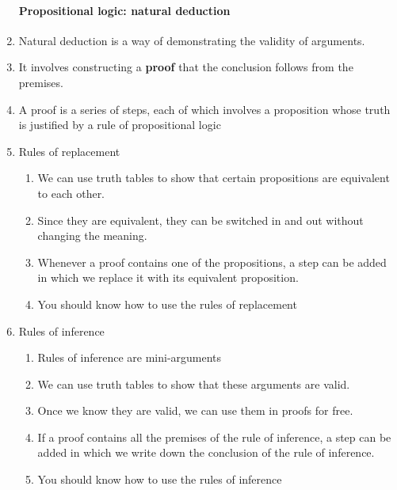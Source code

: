 \documentclass[10pt,landscape]{article}
\begin{document}
\begin{multicols}{2}
\begin{enumerate}
\paragraph{Propositional logic: natural deduction}
   \item Natural deduction is a way of demonstrating the validity of arguments.
   \item It involves constructing a \textbf{proof} that the conclusion follows from the premises.
   \item A proof is a series of steps, each of which involves a proposition whose truth is justified by a rule of propositional logic
   \item Rules of replacement
    \begin{enumerate}
     \item We can use truth tables to show that certain propositions are equivalent to each other.
     \item Since they are equivalent, they can be switched in and out without changing the meaning.
     \item Whenever a proof contains one of the propositions, a step can be added in which we replace it with its equivalent proposition.
     \item You should know how to use the rules of replacement
    \end{enumerate}
   \item Rules of inference
    \begin{enumerate}
     \item Rules of inference are mini-arguments
     \item We can use truth tables to show that these arguments are valid.
     \item Once we know they are valid, we can use them in proofs for free.
     \item If a proof contains all the premises of the rule of inference, a step can be added in which we write down the conclusion of the rule of inference.
     \item You should know how to use the rules of inference
    \end{enumerate}
  

\end{enumerate}
\end{multicols}
\end{document}
